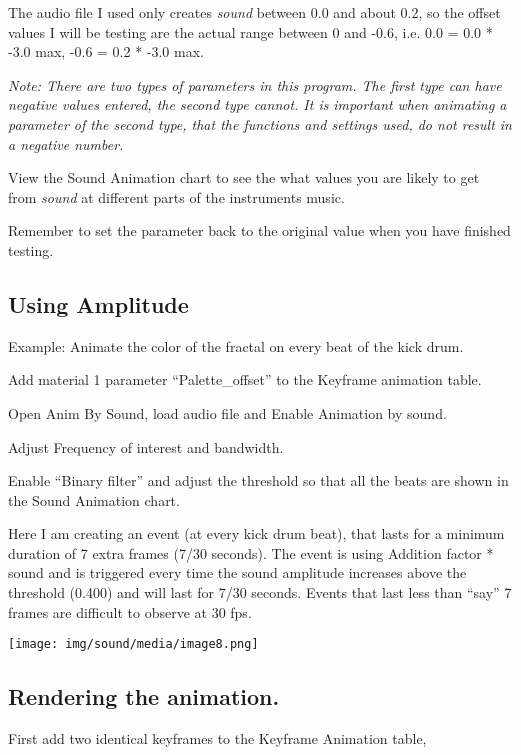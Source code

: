 The audio file I used only creates \emph{sound} between 0.0 and about
0.2, so the offset values I will be testing are the actual range between
0 and -0.6, i.e. 0.0 = 0.0 * -3.0 max, -0.6 = 0.2 * -3.0 max.

\emph{Note: There are two types of parameters in this program. The first
type can have negative values entered, the second type cannot. It is}
\emph{important} \emph{when animating a parameter of the second type,
that the functions and settings used, do not result in a negative
number.}

View the Sound Animation chart to see the what values you are likely to
get from \emph{sound} at different parts of the instruments music.

Remember to set the parameter back to the original value when you have
finished testing.

\subsection{Using Amplitude}\label{using-amplitude}

Example: Animate the color of the fractal on every beat of the kick
drum.

Add material 1 parameter ``Palette\_offset'' to the Keyframe animation
table.

Open Anim By Sound, load audio file and Enable Animation by sound.

Adjust Frequency of interest and bandwidth.

Enable ``Binary filter'' and adjust the threshold so that all the beats
are shown in the Sound Animation chart.

Here I am creating an event (at every kick drum beat), that lasts for a
minimum duration of 7 extra frames (7/30 seconds). The event is using
Addition factor * sound and is triggered every time the sound amplitude
increases above the threshold (0.400) and will last for 7/30 seconds.
Events that last less than ``say'' 7 frames are difficult to observe at
30 fps.

\texttt{[image: img/sound/media/image8.png]}

\subsection{Rendering the animation.}\label{rendering-the-animation.}

First add two identical keyframes to the Keyframe Animation table,

